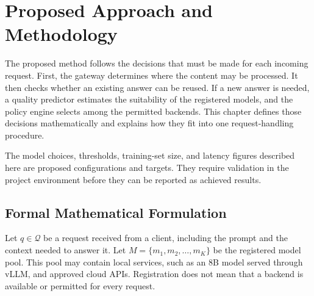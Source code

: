 \chapter{Proposed Approach and Methodology}
\label{ch:methodology}

The proposed method follows the decisions that must be made for each incoming request. First, the gateway determines where the content may be processed. It then checks whether an existing answer can be reused. If a new answer is needed, a quality predictor estimates the suitability of the registered models, and the policy engine selects among the permitted backends. This chapter defines those decisions mathematically and explains how they fit into one request-handling procedure.

The model choices, thresholds, training-set size, and latency figures described here are proposed configurations and targets. They require validation in the project environment before they can be reported as achieved results.

\section{Formal Mathematical Formulation}
\label{sec:formal-formulation}

Let $q\in\mathcal{Q}$ be a request received from a client, including the prompt and the context needed to answer it. Let $M=\{m_1,m_2,\ldots,m_K\}$ be the registered model pool. This pool may contain local services, such as an 8B model served through vLLM, and approved cloud APIs. Registration does not mean that a backend is available or permitted for every request.

